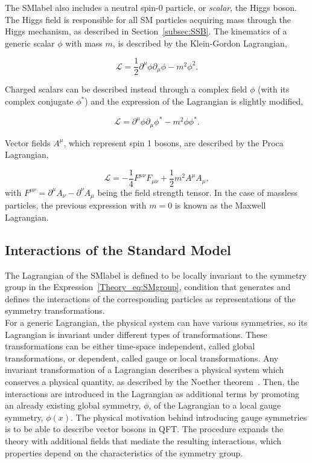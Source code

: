 The \acrshort{SMlabel} also includes a neutral spin-0 particle, or \textit{scalar}, the Higgs boson. The Higgs field is responsible for all SM particles acquiring mass through the Higgs mechanism, as described in Section~\ref{subsec:SSB}.
The kinematics of a generic scalar $\phi$ with mass $m$, is described by the Klein-Gordon Lagrangian,

\begin{equation}
    \label{Theory_eq:KGeq}
    \mathcal{L}=\frac{1}{2}\partial^\mu\phi\partial_\mu\phi - m^2\phi^2.
\end{equation}

Charged scalars can be described instead through a complex field $\phi$ (with its complex conjugate $\phi^*$) and the expression of the Lagrangian is slightly modified,

\begin{equation}
    \label{Theory_eq:KGeqcharged}
    \mathcal{L}=\partial^\mu\phi\partial_\mu\phi^* - m^2\phi\phi^*.
\end{equation}

Vector fields $A^\mu$, which represent spin 1 bosons, are described by the Proca Lagrangian,

\begin{equation}
    \label{Theory_eq:Proca}
    \mathcal{L}=-\frac{1}{4}F^{\mu\nu}F_{\mu\nu}+\frac{1}{2}m^2A^\mu A_\mu,
\end{equation}
with $F^{\mu\nu}=\partial^\mu A_\nu -\partial^\nu A_\mu$ being the field strength tensor.
In the case of massless particles, the previous expression with $m=0$ is known as the Maxwell Lagrangian.

\subsection{Interactions of the Standard Model}
\label{subsec:SMinteractions}
The Lagrangian of the \acrshort{SMlabel} is defined to be locally invariant to the symmetry group in the Expression~\ref{Theory_eq:SMgroup},
condition that generates and defines the interactions of the corresponding particles as representations of the symmetry transformations.\\

For a generic Lagrangian, the physical system can have various symmetries, so its Lagrangian is invariant under different types of transformations.
These transformations can be either time-space independent, called global transformations, or dependent, called gauge or local transformations.
Any invariant transformation of a Lagrangian describes a physical system which conserves a physical quantity, as described by the Noether theorem~\cite{Noether}.
Then, the interactions are introduced in the Lagrangian as additional terms by promoting an already existing global symmetry, $\phi$,
of the Lagrangian to a local gauge symmetry, $\phi(x)$. The physical motivation behind introducing gauge symmetries
is to be able to describe vector bosons in \acrshort{QFT}.
The procedure expands the theory with additional fields that mediate the resulting interactions,
which properties depend on the characteristics of the symmetry group.\\

